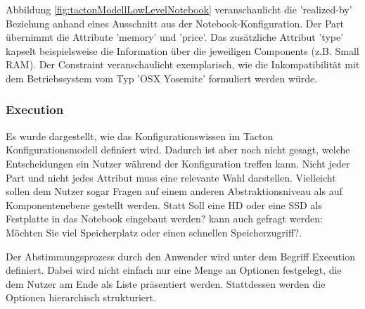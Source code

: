 \documentclass[12pt,a4paper,bibliography=totocnumbered,listof=totoc]{scrartcl}
\begin{document}
Abbildung \ref{fig:tactonModellLowLevelNotebook} veranschaulicht die 'realized-by' Beziehung anhand eines Ausschnitt aus der Notebook-Konfiguration.  Der Part übernimmt die Attribute 'memory' und 'price'. Das zusätzliche Attribut 'type' kapselt beispielsweise die Information über die jeweiligen Components (z.B. Small RAM). Der Constraint veranschaulicht exemplarisch, wie die Inkompatibilität mit dem Betriebssystem vom Typ 'OSX Yosemite' formuliert werden würde.

\subsubsection{Execution}
\label{subsubsection:Execution}
Es wurde dargestellt, wie das Konfigurationswissen im Tacton Konfigurationsmodell definiert wird. Dadurch ist aber noch nicht gesagt, welche Entscheidungen ein Nutzer während der Konfiguration treffen kann. Nicht jeder Part und nicht jedes Attribut muss eine relevante Wahl darstellen. Vielleicht sollen dem Nutzer sogar Fragen auf einem anderen Abstraktionsniveau als auf Komponentenebene gestellt werden. Statt \glqq Soll eine HD oder eine SSD als Festplatte in das Notebook eingebaut werden?\grqq{} kann auch gefragt werden: \glqq Möchten Sie viel Speicherplatz oder einen schnellen Speicherzugriff?\grqq.

Der Abstimmungsprozess durch den Anwender wird unter dem Begriff \glqq Execution\grqq{} definiert. Dabei wird nicht einfach nur eine Menge an Optionen festgelegt, die dem Nutzer am Ende als Liste präsentiert werden. Stattdessen werden die Optionen hierarchisch strukturiert.
\end{document}
